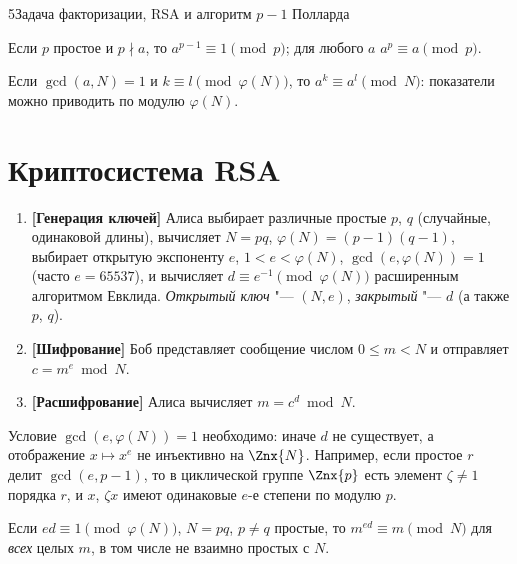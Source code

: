 \begin{lecture}{5}{Задача факторизации, RSA и алгоритм \texorpdfstring{$p - 1$}{p - 1} Полларда}
\begin{corollary}\label{l5:fermat}
Если $p$ простое и $p \nmid a$, то $a^{p-1} \equiv 1 \pmod p$; для любого $a$
$a^p \equiv a \pmod p$.
\end{corollary}

\begin{corollary}\label{l5:exp-reduce}
Если $\gcd(a, N) = 1$ и $k \equiv l \pmod{\varphi(N)}$, то $a^k \equiv a^l \pmod N$: показатели
можно приводить по модулю $\varphi(N)$.
\end{corollary}


\section{Криптосистема RSA}

\begin{algorithm}[RSA]\label{l5:rsa}
\begin{enumerate}
  \item \textbf{[Генерация ключей]} Алиса выбирает различные простые $p$, $q$ (случайные,
    одинаковой длины), вычисляет $N = pq$, $\varphi(N) = (p - 1)(q - 1)$, выбирает открытую
    экспоненту $e$, $1 < e < \varphi(N)$, $\gcd(e, \varphi(N)) = 1$ (часто $e = 65537$), и
    вычисляет $d \equiv e^{-1} \pmod{\varphi(N)}$ расширенным алгоритмом Евклида.
    \emph{Открытый ключ} "--- $(N, e)$, \emph{закрытый} "--- $d$ (а также $p$, $q$).
  \item \textbf{[Шифрование]} Боб представляет сообщение числом $0 \le m < N$ и отправляет
    $c = m^e \bmod N$.
  \item \textbf{[Расшифрование]} Алиса вычисляет $m = c^d \bmod N$.
\end{enumerate}
\end{algorithm}

Условие $\gcd(e, \varphi(N)) = 1$ необходимо: иначе $d$ не существует, а отображение
$x \mapsto x^e$ не инъективно на $\Znx{N}$. Например, если простое $r$ делит
$\gcd(e, p - 1)$, то в циклической группе $\Znx{p}$ есть элемент $\zeta \ne 1$ порядка $r$, и
$x$, $\zeta x$ имеют одинаковые $e$-е степени по модулю $p$.

\begin{theorem}\label{l5:rsa-correct}
Если $ed \equiv 1 \pmod{\varphi(N)}$, $N = pq$, $p \ne q$ простые, то $m^{ed} \equiv m \pmod N$
для \emph{всех} целых $m$, в том числе не взаимно простых с $N$.
\end{theorem}


\end{lecture}
